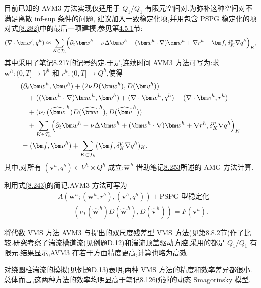 \begin{note}
\label{note:vms-avm3-realization}
目前已知的 AVM3 方法实现仅适用于 $Q_1/Q_1$ 有限元空间对.为弥补这种空间对不满足离散 inf-sup 条件的问题,\textcite{GravemeierGeeKronbichlerWall2010} 建议加入一致稳定化项,并用包含 PSPG 稳定化的项对式\hyperref[eq:vms-avm-unresolved-bracket]{(8.282)}中的最后一项建模,参见第\hyperref[sec:stokes-pspg]{4.5.1}节:
\[
 (\nabla\cdot\bm w',q^h)\approx
 \sum_{K\in\mathcal T_h}\Bigl(
   \partial_t\bm w^h-\nu\Delta\bm w^h
   +(\bm w^h\cdot\nabla)\bm w^h
   +\nabla r^h-\bm f,
   \delta_K^p\nabla q^h\Bigr)_K,
\]
其中采用了笔记\hyperref[note:vms-notation]{8.217}的记号约定.于是,连续时间 AVM3 方法可写为:求 $\bm w^h:(0,T]\to V^h$ 和 $r^h:(0,T]\to Q^h$,使得
\begin{equation}\label{eq:vms-avm3-continuous-time-method}
\begin{aligned}
 &(\partial_t\bm w^h,\bm v^h)
 +(2\nu D(\bm w^h),D(\bm v^h))\\
 &\quad+((\bm w^h\cdot\nabla)\bm w^h,\bm v^h)
 +(\nabla\cdot\bm w^h,q^h)
 -(\nabla\cdot\bm v^h,r^h)\\
 &\quad+(\nu_T(\widehat{\bm w}^{\,h})
   D(\widehat{\bm w}^{\,h}),D(\widehat{\bm v}^{\,h}))\\
 &\quad+\sum_{K\in\mathcal T_h}\Bigl(
   \partial_t\bm w^h-\nu\Delta\bm w^h
   +(\bm w^h\cdot\nabla)\bm w^h+\nabla r^h,
   \delta_K^p\nabla q^h\Bigr)_K\\
 &=(\bm f,\bm v^h)
   +\sum_{K\in\mathcal T_h}
      (\bm f,\delta_K^p\nabla q^h)_K.
\end{aligned}
\end{equation}
其中,对所有 $(\bm v^h,q^h)\in V^h\times Q^h$ 成立;$\widehat{\bm w}^{\,h}$ 借助笔记\hyperref[note:vms-avm-small-scale-definition]{8.253}所述的 AMG 方法计算.

利用式\hyperref[eq:variational-navier-stokes-weak-form]{(8.243)}的简记,AVM3 方法可写为
\begin{equation}\label{eq:vms-avm3-short-form}
 \begin{aligned}
 &A(\bm w^h;(\bm w^h,r^h),(\bm v^h,q^h))
   +\text{PSPG 型稳定化}\\
 &\quad+(\nu_T(\widehat{\bm w}^{\,h})
   D(\widehat{\bm w}^{\,h}),D(\widehat{\bm v}^{\,h}))
   =F(\bm v^h).
 \end{aligned}
\end{equation}
\end{note}

\begin{note}[数值计算经验]
\label{note:vms-avm3-numerical-experience}
\textcite{GravemeierGeeKronbichlerWall2010} 将代数 VMS 方法 AVM3 与\textcite{Bazilevs2007}提出的双尺度残差型 VMS 方法(见第\hyperref[subsec:vms-residual-based-method]{8.8.2}节)作了比较.研究考察了湍流槽道流(见例题\hyperref[ex:appendix-d-12]{D.12})和湍流顶盖驱动方腔,采用的都是 $Q_1/Q_1$ 有限元.结果显示,AVM3 在若干方面精度更高,计算也略为高效.

\textcite{GravemeierKronbichlerGeeWall2011} 对绕圆柱湍流的模拟(见例题\hyperref[ex:appendix-d-13]{D.13})表明,两种 VMS 方法的精度和效率差异都很小.总体而言,这两种方法的效率均明显高于笔记\hyperref[note:dynamic-smagorinsky-model]{8.126}所述的动态 Smagorinsky 模型.
\end{note}

